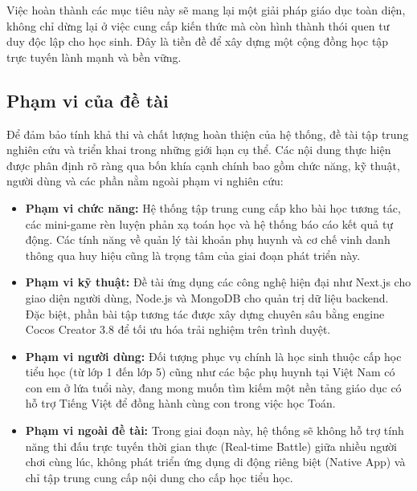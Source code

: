 Việc hoàn thành các mục tiêu này sẽ mang lại một giải pháp giáo dục toàn diện, không chỉ dừng lại ở việc cung cấp kiến thức mà còn hình thành thói quen tư duy độc lập cho học sinh. Đây là tiền đề để xây dựng một cộng đồng học tập trực tuyến lành mạnh và bền vững.

\subsection{Phạm vi của đề tài}

Để đảm bảo tính khả thi và chất lượng hoàn thiện của hệ thống, đề tài tập trung nghiên cứu và triển khai trong những giới hạn cụ thể. Các nội dung thực hiện được phân định rõ ràng qua bốn khía cạnh chính bao gồm chức năng, kỹ thuật, người dùng và các phần nằm ngoài phạm vi nghiên cứu:

\begin{itemize} \item \textbf{Phạm vi chức năng:} Hệ thống tập trung cung cấp kho bài học tương tác, các mini-game rèn luyện phản xạ toán học và hệ thống báo cáo kết quả tự động. Các tính năng về quản lý tài khoản phụ huynh và cơ chế vinh danh thông qua huy hiệu cũng là trọng tâm của giai đoạn phát triển này.
	
	\item \textbf{Phạm vi kỹ thuật:} Đề tài ứng dụng các công nghệ hiện đại như Next.js cho giao diện người dùng, Node.js và MongoDB cho quản trị dữ liệu backend. Đặc biệt, phần bài tập tương tác được xây dựng chuyên sâu bằng engine Cocos Creator 3.8 để tối ưu hóa trải nghiệm trên trình duyệt.
	
	\item \textbf{Phạm vi người dùng:} Đối tượng phục vụ chính là học sinh thuộc cấp học tiểu học (từ lớp 1 đến lớp 5) cũng như các bậc phụ huynh tại Việt Nam có con em ở lứa tuổi này, đang mong muốn tìm kiếm một nền tảng giáo dục có hỗ trợ Tiếng Việt để đồng hành cùng con trong việc học Toán.
	
	\item \textbf{Phạm vi ngoài đề tài:} Trong giai đoạn này, hệ thống sẽ không hỗ trợ tính năng thi đấu trực tuyến thời gian thực (Real-time Battle) giữa nhiều người chơi cùng lúc, không phát triển ứng dụng di động riêng biệt (Native App) và chỉ tập trung cung cấp nội dung cho cấp học tiểu học.
\end{itemize}